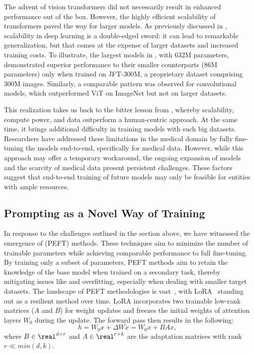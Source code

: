 The advent of vision transformers did not necessarily result in enhanced performance out of the box. However, the highly efficient scalability of transformers paved the way for larger models. As previously discussed in , scalability in deep learning is a double-edged sword: it can lead to remarkable generalization, but that comes at the expense of larger datasets and increased training costs. To illustrate, the largest models in , with 632M parameters, demonstrated superior performance to their smaller counterparts (86M parameters) only when trained on JFT-300M, a proprietary dataset comprising 300M images. Similarly, a comparable pattern was observed for convolutional models, which outperformed ViT on ImageNet but not on larger datasets.

This realization takes us back to the bitter lesson from , whereby scalability, compute power, and data outperform a human-centric approach. At the same time, it brings additional difficulty in training models with such big datasets. Researchers have addressed these limitations in the medical domain by fully fine-tuning the models end-to-end, specifically for medical data. However, while this approach may offer a temporary workaround, the ongoing expansion of models and the scarcity of medical data present persistent challenges. These factors suggest that end-to-end training of future models may only be feasible for entities with ample resources.

\subsection{Prompting as a Novel Way of Training}

In response to the challenges outlined in the section above, we have witnessed the emergence of  (PEFT) methods. These techniques aim to minimize the number of trainable parameters while achieving comparable performance to full fine-tuning. By training only a subset of parameters, PEFT methods aim to retain the knowledge of the base model when trained on a secondary task, thereby mitigating issues like  and overfitting, especially when dealing with smaller target datasets. The landscape of PEFT methodologies is vast~, with LoRA~ standing out as a resilient method over time. LoRA incorporates two trainable low-rank matrices ($A$ and $B$) for weight updates and freezes the initial weights of attention layers $W_0$ during the update. The forward pass then results in the following:
\begin{equation*}
    h = W_0x + \Delta Wx = W_0x + BAx,
\end{equation*}
where $B\in\real^{d\times r}$ and $A\in\real^{r\times k}$ are the adaptation matrices with rank $r \ll min(d,k)$. 

